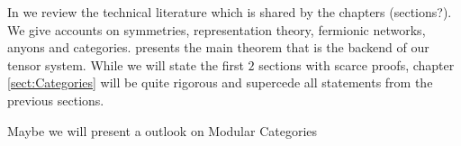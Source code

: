 In  we review the technical literature which is shared by the
chapters (sections?). We give accounts on symmetries, representation theory, fermionic
networks, anyons and categories.  presents the
main theorem that is the backend of our tensor system. While we will state the first $2$
sections with scarce proofs, chapter \cref{sect:Categories} will be quite rigorous and supercede all
statements from the previous sections.

Maybe we will present a outlook on Modular Categories 

